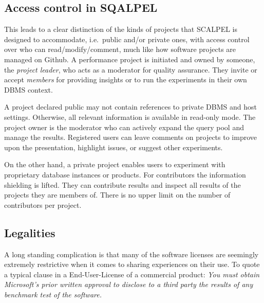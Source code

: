\documentclass{cidr-2019}
\begin{document}
\subsection{Access control in SQALPEL}
This leads to a clear distinction of the kinds of projects that {\sc
  SCALPEL} is designed to accommodate, i.e.\ public and/or private
ones, with access control over who can read/modify/comment, much like
how software projects are managed on Github. A performance project is
initiated and owned by someone, the \emph{project leader}, who acts as
a moderator for quality assurance. They invite or accept
\emph{members} for providing insights or to run the experiments in
their own DBMS context.

A project declared public may not contain references to private DBMS
and host settings. Otherwise, all relevant information is available in
read-only mode. The project owner is the moderator who can actively
expand the query pool and manage the results. Registered users can
leave comments on projects to improve upon the presentation, highlight
issues, or suggest other experiments.

On the other hand, a private project enables users to experiment with
proprietary database instances or products. For contributors the
information shielding is lifted. They can contribute results and
inspect all results of the projects they are members of. There is no
upper limit on the number of contributors per project.

\subsection{Legalities\label{legalities}}






A long standing complication is that many of the software licenses are
seemingly extremely restrictive when it comes to sharing experiences
on their use. To quote a typical clause in a End-User-License of a
commercial product: \emph{ You must obtain Microsoft's prior written approval
  to disclose to a third party the results of any benchmark test of
  the software.}
\end{document}
